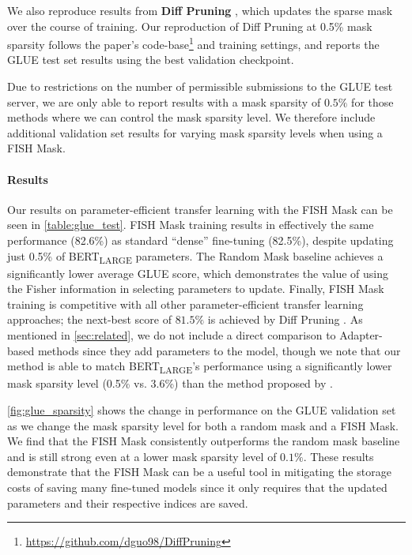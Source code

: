 We also reproduce results from \textbf{Diff Pruning} \citep{DBLP:journals/corr/abs-2012-07463}, which updates the sparse mask over the course of training. Our reproduction of Diff Pruning at 0.5\% mask sparsity follows the paper's code-base\footnote{\url{https://github.com/dguo98/DiffPruning}} and training settings, and reports the GLUE test set results using the best validation checkpoint. 

Due to restrictions on the number of permissible submissions to the GLUE test server, we are only able to report results with a mask sparsity of $0.5\%$ for those methods where we can control the mask sparsity level. We therefore include additional validation set results for varying mask sparsity levels when using a FISH Mask.

\paragraph{Results}

Our results on parameter-efficient transfer learning with the FISH Mask can be seen in \ref{table:glue_test}.
FISH Mask training results in effectively the same performance (82.6\%) as standard ``dense'' fine-tuning (82.5\%), despite updating just 0.5\% of  BERT\textsubscript{LARGE} parameters. The Random Mask baseline achieves a significantly lower average GLUE score, which demonstrates the value of using the Fisher information in selecting parameters to update. Finally, FISH Mask training is competitive with all other parameter-efficient transfer learning approaches; the next-best score of $81.5\%$ is achieved by Diff Pruning  \citep{DBLP:journals/corr/abs-2012-07463}. As mentioned in \ref{sec:related}, we do not include a direct comparison to Adapter-based methods since they add parameters to the model, though we note that our method is able to match BERT\textsubscript{LARGE}'s performance using a significantly lower mask sparsity level (0.5\% vs. 3.6\%) than the method proposed by \citet{DBLP:journals/corr/abs-1902-00751}.

\ref{fig:glue_sparsity} shows the change in performance on the GLUE validation set as we change the mask sparsity level for both a random mask and a FISH Mask. We find that the FISH Mask consistently outperforms the random mask baseline and is still strong even at a lower mask sparsity level of $0.1\%$.
These results demonstrate that the FISH Mask can be a useful tool in mitigating the storage costs of saving many fine-tuned models since it only requires that the updated parameters and their respective indices are saved.

